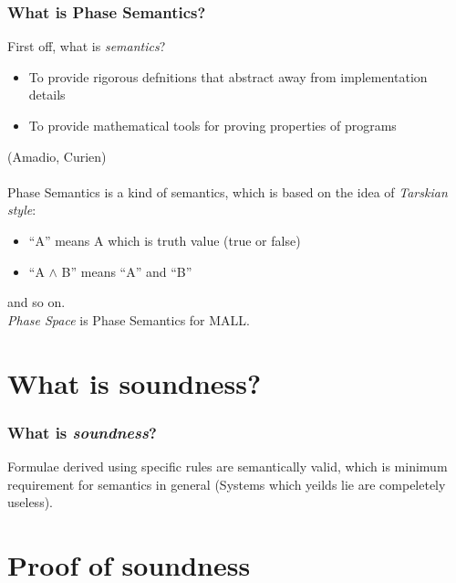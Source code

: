 \documentclass[dvipdfmx,cjk]{beamer}
\theoremstyle{example}
\begin{document}
\begin{frame} 
  \frametitle{What is Phase Semantics?}

  First off, what is \textit{semantics}?

  \begin{itemize}
    \item To provide rigorous defnitions that abstract away from implementation
      details
    \item To provide mathematical tools for proving properties of programs
  \end{itemize}
   (Amadio, Curien)\\~\\

  Phase Semantics is a kind of semantics, which is based on the idea of \textit{Tarskian style}: \\

  \begin{itemize}
    \item ``A'' means A which is truth value (true or false)
    \item ``A $\wedge$ B'' means ``A'' and ``B''
  \end{itemize}

  and so on.\\

  \textit{Phase Space} is Phase Semantics for MALL.
  
\end{frame}

                          \section{What is soundness?}
                          
\begin{frame}
  \frametitle{What is \textit{soundness}?} 

  Formulae derived using specific rules are semantically valid, which is minimum requirement for semantics in general (Systems which yeilds lie are compeletely useless).
  
\end{frame}

                          \section{Proof of soundness}
                          
\end{document}
